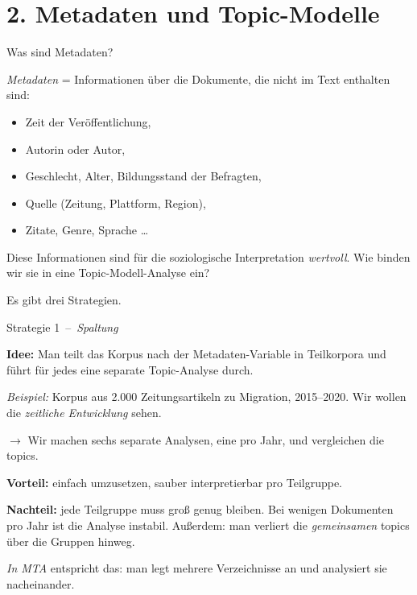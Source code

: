 \documentclass[aspectratio=169,11pt]{beamer}
\newcommand{\mdash}{\,{\monodash–}\,}
\let\oldemph\emph
\renewcommand{\emph}[1]{{\color{solCyan}\oldemph{#1}}}
\let\oldtextbf\textbf
\renewcommand{\textbf}[1]{{\color{solBase3}\oldtextbf{#1}}}
\begin{document}
\section{2. Metadaten und Topic-Modelle}

\begin{frame}{Was sind Metadaten?}

  \emph{Meta\-daten} = Informationen über die Dokumente, die nicht
  im Text enthalten sind:
  \vfill
  \begin{itemize}
    \item Zeit der Veröffentlichung,
    \item Autorin oder Autor,
    \item Geschlecht, Alter, Bildungsstand der Befragten,
    \item Quelle (Zeitung, Plattform, Region),
    \item Zitate, Genre, Sprache \ldots
  \end{itemize}

  \vfill
  Diese Informationen sind für die soziologische Interpretation
  \emph{wertvoll}. Wie binden wir sie in eine Topic-Modell-Analyse ein?

  \vfill
  Es gibt drei Strategien.

\end{frame}

\begin{frame}{Strategie 1 \mdash{} \emph{Spaltung}}

  \textbf{Idee:} Man teilt das Korpus nach der Metadaten-Variable
  in Teilkorpora und führt für jedes eine separate Topic-Analyse durch.

  \vfill
  \emph{Beispiel:} Korpus aus 2.000 Zeitungsartikeln zu Migration,
  2015–2020. Wir wollen die \emph{zeitliche Entwicklung} sehen.

  $\rightarrow$ Wir machen sechs separate Analysen, eine pro Jahr,
  und vergleichen die topics.

  \vfill
  \textbf{Vorteil:} einfach umzusetzen, sauber interpretierbar pro
  Teilgruppe.

  \vfill
  \textbf{Nachteil:} jede Teilgruppe muss groß genug bleiben.
  Bei wenigen Dokumenten pro Jahr ist die Analyse instabil.
  Außerdem: man verliert die \emph{gemeinsamen} topics über die
  Gruppen hinweg.

  \vfill
  \footnotesize\color{black!60}
  \emph{In MTA} entspricht das: man legt mehrere Verzeichnisse an
  und analysiert sie nacheinander.

\end{frame}
\end{document}
